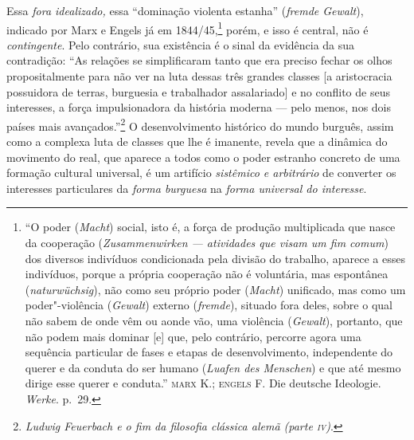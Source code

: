 Essa \emph{fora idealizado,} essa ``dominação violenta estanha''
(\emph{fremde Gewalt}), indicado por Marx e Engels já em 1844/45,\footnote{``O poder (\emph{Macht}) social, isto é, a força de produção
  multiplicada que nasce da cooperação (\emph{Zusammenwirken ---
  atividades que visam um fim comum}) dos diversos indivíduos
  condicionada pela divisão do trabalho, aparece a esses indivíduos,
  porque a própria cooperação não é voluntária, mas espontânea
  (\emph{naturwüchsig}), não como seu próprio poder (\emph{Macht})
  unificado, mas como um poder"-violência (\emph{Gewalt}) externo
  (\emph{fremde}), situado fora deles, sobre o qual não sabem de onde
  vêm ou aonde vão, uma violência (\emph{Gewalt}), portanto, que não
  podem mais dominar {[}e{]} que, pelo contrário, percorre agora uma
  sequência particular de fases e etapas de desenvolvimento,
  independente do querer e da conduta do ser humano (\emph{Luafen des
  Menschen}) e que até mesmo dirige esse querer e conduta.''
  \textsc{marx} K.; \textsc{engels} F. Die deutsche Ideologie.
  \emph{Werke}. p.~29.} porém, e isso é central, não é
\emph{contingente}. Pelo contrário, sua existência é o sinal da
evidência da sua contradição: ``As relações se simplificaram tanto que
era preciso fechar os olhos propositalmente para não ver na luta dessas
três grandes classes {[}a aristocracia possuidora de terras, burguesia e
trabalhador assalariado{]} e no conflito de seus interesses, a força
impulsionadora da história moderna --- pelo menos, nos dois países mais
avançados.''\footnote{\emph{Ludwig Feuerbach e o fim da filosofia
  clássica alemã (parte \textsc{iv})}.} O desenvolvimento histórico do
mundo burguês, assim como a complexa luta de classes que lhe é imanente,
revela que a dinâmica do movimento do real, que aparece a todos como o
poder estranho concreto de uma formação cultural universal, é um
artifício \emph{sistêmico e arbitrário} de converter os interesses
particulares da \emph{forma burguesa} na \emph{forma universal do
interesse}.

